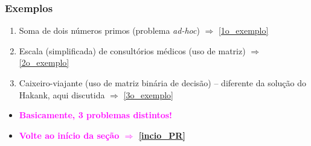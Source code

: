 \begin{frame}[fragile] 

\frametitle{Exemplos}

\label{3_exemplos}
\begin{block}{}
\begin{enumerate}
  \item Soma de dois números primos (problema \textit{ad-hoc})
  $\Rightarrow $ \ref{1o_exemplo}
  
  
  \pause
  \item Escala (simplificada) de consultórios médicos (uso de
  matriz)   $\Rightarrow $ \ref{2o_exemplo}
    
  \pause
  \item Caixeiro-viajante (uso de matriz binária de decisão) -- diferente
  da solução do Hakank, aqui discutida $\Rightarrow $ \ref{3o_exemplo}
      
\end{enumerate}
\end{block}

  \begin{center}
\begin{itemize}

    \item  \textbf{\textcolor{magenta}{Basicamente, 3 problemas distintos!}}
    
 \item  \textbf{\textcolor{magenta}{Volte ao início da seção $\Rightarrow$ \ref{incio_PR} }  }

  \end{itemize}  

  \end{center}

\end{frame}



